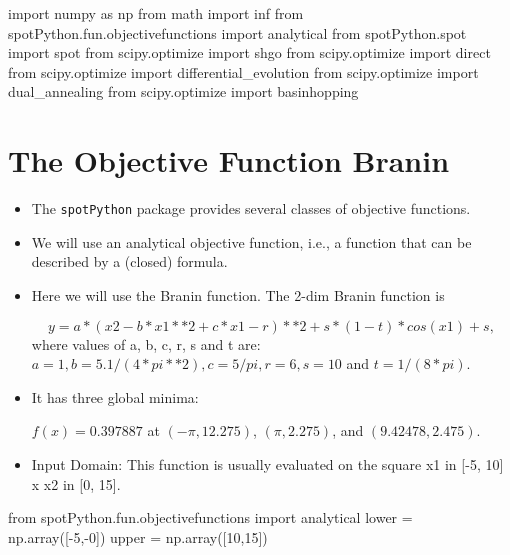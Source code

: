 \documentclass[
  letterpaper,
  DIV=11,
  numbers=noendperiod]{scrreprt}
\newenvironment{Shaded}{\begin{snugshade}}{\end{snugshade}}
\newcommand{\DecValTok}[1]{\textcolor[rgb]{0.68,0.00,0.00}{#1}}
\newcommand{\ImportTok}[1]{\textcolor[rgb]{0.00,0.46,0.62}{#1}}
\newcommand{\NormalTok}[1]{\textcolor[rgb]{0.00,0.23,0.31}{#1}}
\newcommand{\OperatorTok}[1]{\textcolor[rgb]{0.37,0.37,0.37}{#1}}
\begin{document}
\begin{Shaded}
\begin{Highlighting}[]
\ImportTok{import}\NormalTok{ numpy }\ImportTok{as}\NormalTok{ np}
\ImportTok{from}\NormalTok{ math }\ImportTok{import}\NormalTok{ inf}
\ImportTok{from}\NormalTok{ spotPython.fun.objectivefunctions }\ImportTok{import}\NormalTok{ analytical}
\ImportTok{from}\NormalTok{ spotPython.spot }\ImportTok{import}\NormalTok{ spot}
\ImportTok{from}\NormalTok{ scipy.optimize }\ImportTok{import}\NormalTok{ shgo}
\ImportTok{from}\NormalTok{ scipy.optimize }\ImportTok{import}\NormalTok{ direct}
\ImportTok{from}\NormalTok{ scipy.optimize }\ImportTok{import}\NormalTok{ differential\_evolution}
\ImportTok{from}\NormalTok{ scipy.optimize }\ImportTok{import}\NormalTok{ dual\_annealing}
\ImportTok{from}\NormalTok{ scipy.optimize }\ImportTok{import}\NormalTok{ basinhopping}
\end{Highlighting}
\end{Shaded}

\hypertarget{the-objective-function-branin}{%
\section{The Objective Function
Branin}\label{the-objective-function-branin}}

\begin{itemize}
\item
  The \texttt{spotPython} package provides several classes of objective
  functions.
\item
  We will use an analytical objective function, i.e., a function that
  can be described by a (closed) formula.
\item
  Here we will use the Branin function. The 2-dim Branin function is

  \[y = a * (x2 - b * x1**2 + c * x1 - r) ** 2 + s * (1 - t) * cos(x1) + s,\]
  where values of a, b, c, r, s and t are:
  \(a = 1, b = 5.1 / (4*pi**2), c = 5 / pi, r = 6, s = 10\) and
  \(t = 1 / (8*pi)\).
\item
  It has three global minima:

  \(f(x) = 0.397887\) at \((-\pi, 12.275)\), \((\pi, 2.275)\), and
  \((9.42478, 2.475)\).
\item
  Input Domain: This function is usually evaluated on the square x1 in
  {[}-5, 10{]} x x2 in {[}0, 15{]}.
\end{itemize}

\begin{Shaded}
\begin{Highlighting}[]
\ImportTok{from}\NormalTok{ spotPython.fun.objectivefunctions }\ImportTok{import}\NormalTok{ analytical}
\NormalTok{lower }\OperatorTok{=}\NormalTok{ np.array([}\OperatorTok{{-}}\DecValTok{5}\NormalTok{,}\OperatorTok{{-}}\DecValTok{0}\NormalTok{])}
\NormalTok{upper }\OperatorTok{=}\NormalTok{ np.array([}\DecValTok{10}\NormalTok{,}\DecValTok{15}\NormalTok{])}
\end{Highlighting}
\end{Shaded}
\end{document}
